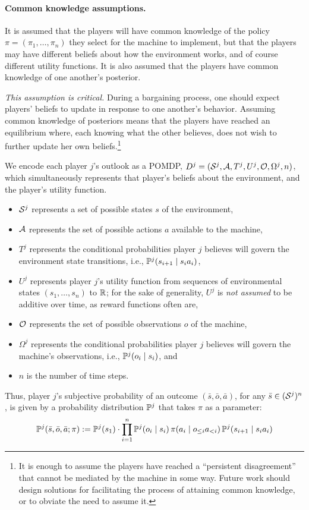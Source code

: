 \documentclass{article}  %
\newcommand{\seq}{\bar}
\newcommand{\hist}[1]{o_{\le #1}a_{<#1}}
\begin{document}
\paragraph{Common knowledge assumptions.}  It is assumed that the players will have common knowledge of the policy $\pi = (\pi_1,\ldots,\pi_n)$ they select for the machine to implement, but that the players may have different beliefs about how the environment works, and of course different utility functions.  It is also assumed that the players have common knowledge of one another's posterior.  

\emph{This assumption is critical.}  During a bargaining process, one should expect players' beliefs to update in response to one another's behavior.   Assuming common knowledge of posteriors means that the players have reached an equilibrium where, each knowing what the other believes, does not wish to further update her own beliefs.\footnote{It is enough to assume the players have reached a ``persistent disagreement'' that cannot be mediated by the machine in some way.  Future work should design solutions for facilitating the process of attaining common knowledge, or to obviate the need to assume it.}

We encode each player $j$'s outlook as a POMDP, $D^j = (\mathcal{S}^j,\mathcal{A},T^j, U^j, \mathcal{O}, \Omega^j, n)$, which simultaneously represents that player's beliefs about the environment, and the player's utility function.
\begin{itemize}
\item $\mathcal{S}^j$ represents a set of possible states $s$ of the environment,
\item $\mathcal{A}$ represents the set of possible actions $a$ available to the machine,
\item $T^j$ represents the conditional probabilities player $j$ believes will govern the environment state transitions, i.e., $\mathbb{P}^j(s_{i+1}\mid s_i a_i)$,
\item $U^j$ represents player $j$'s utility function from sequences of environmental states $(s_1,\ldots,s_n)$ to $\mathbb{R}$; for the sake of generality, $U^j$ is \emph{not assumed} to be additive over time, as reward functions often are, 
\item $\mathcal{O}$ represents the set of possible observations $o$ of the machine, 
\item $\Omega^j$ represents the conditional probabilities player $j$ believes will govern the machine's observations, i.e., $\mathbb{P}^j(o_i\mid s_i)$, and
\item $n$ is the number of time steps.
\end{itemize}
%
Thus, player $j$'s subjective probability of an outcome $(\seq s, \seq o, \seq a)$, for any $\seq s \in (\Ss^j)^n$, is given by a probability distribution $\mathbb{P}^j$ that takes $\pi$ as a parameter:
\begin{equation}\label{eqn:pomdp}
\PP^j(\seq s, \seq o, \seq a ; \pi) := \PP^j(s_1) \cdot \prod_{i=1}^{n} 
\PP^j(o_i \mid s_i)\, \pi(a_i \mid \hist i)\, \PP^j(s_{i+1} \mid s_ia_i)
\end{equation}
\end{document}
